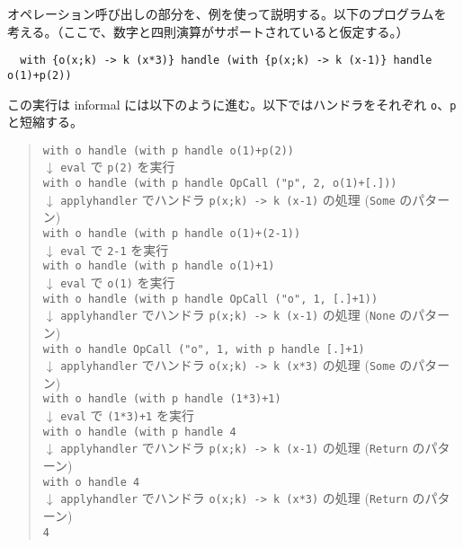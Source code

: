 オペレーション呼び出しの部分を、例を使って説明する。以下のプログラムを
考える。（ここで、数字と四則演算がサポートされていると仮定する。）
\vspace{-5pt}
\begin{verbatim}
  with {o(x;k) -> k (x*3)} handle (with {p(x;k) -> k (x-1)} handle o(1)+p(2))
\end{verbatim}
\vspace{-5pt}
この実行は informal には以下のように進む。以下ではハンドラをそれぞれ \texttt{\LBR{}o\RBR}、\texttt{\LBR{}p\RBR} と短縮する。
\begin{quote}
\texttt{with \LBR{}o\RBR{} handle (with \LBR{}p\RBR{} handle o(1)+p(2))}\\
$\downarrow$ \texttt{eval} で \texttt{p(2)} を実行\\
\texttt{with \LBR{}o\RBR{} handle (with \LBR{}p\RBR{} handle OpCall ("p", 2, o(1)+[.]))}\\
$\downarrow$ \texttt{apply\US{}handler} でハンドラ \texttt{\LBR{}p(x;k) -> k (x-1)\RBR} の処理 (\texttt{Some} のパターン)\\
\texttt{with \LBR{}o\RBR{} handle (with \LBR{}p\RBR{} handle o(1)+(2-1))}\\
$\downarrow$ \texttt{eval} で \texttt{2-1} を実行\\
\texttt{with \LBR{}o\RBR{} handle (with \LBR{}p\RBR{} handle o(1)+1)}\\
$\downarrow$ \texttt{eval} で \texttt{o(1)} を実行\\
\texttt{with \LBR{}o\RBR{} handle (with \LBR{}p\RBR{} handle OpCall ("o", 1, [.]+1))}\\
$\downarrow$ \texttt{apply\US{}handler} でハンドラ \texttt{\LBR{}p(x;k) -> k (x-1)\RBR} の処理 (\texttt{None} のパターン)\\
\texttt{with \LBR{}o\RBR{} handle OpCall ("o", 1, with \LBR{}p\RBR{} handle [.]+1)}\\
$\downarrow$ \texttt{apply\US{}handler} でハンドラ \texttt{\LBR{}o(x;k) -> k (x*3)\RBR} の処理 (\texttt{Some} のパターン)\\
\texttt{with \LBR{}o\RBR{} handle (with \LBR{}p\RBR{} handle (1*3)+1)}\\
$\downarrow$ \texttt{eval} で \texttt{(1*3)+1} を実行\\
\texttt{with \LBR{}o\RBR{} handle (with \LBR{}p\RBR{} handle 4}\\
$\downarrow$ \texttt{apply\US{}handler} でハンドラ \texttt{\LBR{}p(x;k) -> k (x-1)\RBR} の処理 (\texttt{Return} のパターン)\\
\texttt{with \LBR{}o\RBR{} handle 4}\\
$\downarrow$ \texttt{apply\US{}handler} でハンドラ \texttt{\LBR{}o(x;k) -> k (x*3)\RBR} の処理 (\texttt{Return} のパターン)\\
\texttt{4}
\end{quote}

